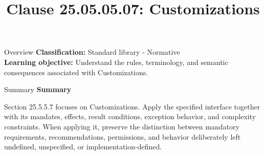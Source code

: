 \documentclass[10pt,letterpaper]{article}
\title{Clause 25.05.05.07: Customizations}
\author{}
\date{}
\begin{document}
\maketitle
\begin{CornellOverviewBox}{Overview}
\textbf{Classification:} Standard library - Normative\\[2pt]
\textbf{Learning objective:} Understand the rules, terminology, and semantic consequences associated with Customizations.
\end{CornellOverviewBox}\begin{CornellSummaryBox}{Summary}
{\sffamily\bfseries\color{Accent} Summary}\par\vspace{3pt}Section 25.5.5.7 focuses on Customizations. Apply the specified interface together with its mandates, effects, result conditions, exception behavior, and complexity constraints. When applying it, preserve the distinction between mandatory requirements, recommendations, permissions, and behavior deliberately left undefined, unspecified, or implementation-defined.
\end{CornellSummaryBox}
\end{document}

